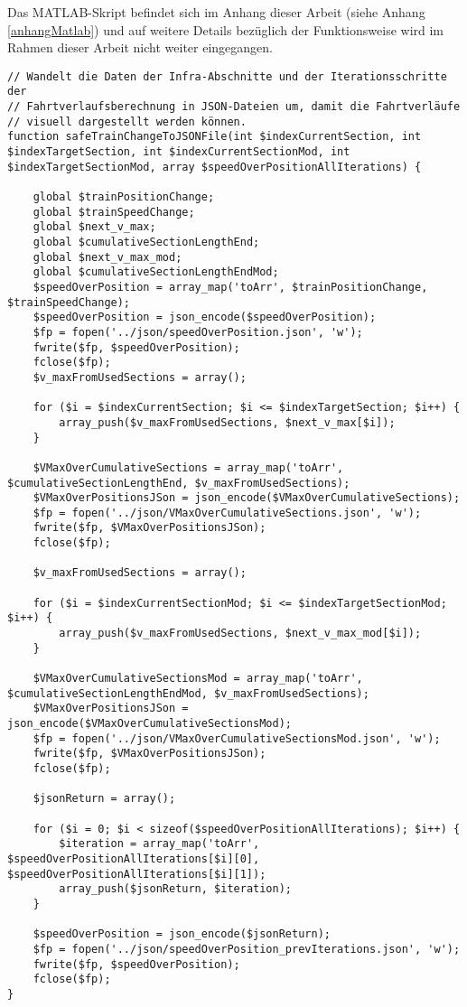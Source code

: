 Das MATLAB-Skript befindet sich im Anhang dieser Arbeit (siehe Anhang \ref{anhangMatlab}) und auf weitere Details bezüglich der Funktionsweise wird im Rahmen dieser Arbeit nicht weiter eingegangen.
\begin{lstlisting}[caption={\textit{safeTrainChangeToJSONFile$($$)$} (\textit{functions\_fahrtverlauf.php})},captionpos=b,label={lst:safeTrainChangeToJSONFile}]
// Wandelt die Daten der Infra-Abschnitte und der Iterationsschritte der
// Fahrtverlaufsberechnung in JSON-Dateien um, damit die Fahrtverläufe
// visuell dargestellt werden können.
function safeTrainChangeToJSONFile(int $indexCurrentSection, int $indexTargetSection, int $indexCurrentSectionMod, int $indexTargetSectionMod, array $speedOverPositionAllIterations) {

	global $trainPositionChange;
	global $trainSpeedChange;
	global $next_v_max;
	global $cumulativeSectionLengthEnd;
	global $next_v_max_mod;
	global $cumulativeSectionLengthEndMod;
	$speedOverPosition = array_map('toArr', $trainPositionChange, $trainSpeedChange);
	$speedOverPosition = json_encode($speedOverPosition);
	$fp = fopen('../json/speedOverPosition.json', 'w');
	fwrite($fp, $speedOverPosition);
	fclose($fp);
	$v_maxFromUsedSections = array();

	for ($i = $indexCurrentSection; $i <= $indexTargetSection; $i++) {
		array_push($v_maxFromUsedSections, $next_v_max[$i]);
	}

	$VMaxOverCumulativeSections = array_map('toArr', $cumulativeSectionLengthEnd, $v_maxFromUsedSections);
	$VMaxOverPositionsJSon = json_encode($VMaxOverCumulativeSections);
	$fp = fopen('../json/VMaxOverCumulativeSections.json', 'w');
	fwrite($fp, $VMaxOverPositionsJSon);
	fclose($fp);

	$v_maxFromUsedSections = array();

	for ($i = $indexCurrentSectionMod; $i <= $indexTargetSectionMod; $i++) {
		array_push($v_maxFromUsedSections, $next_v_max_mod[$i]);
	}

	$VMaxOverCumulativeSectionsMod = array_map('toArr', $cumulativeSectionLengthEndMod, $v_maxFromUsedSections);
	$VMaxOverPositionsJSon = json_encode($VMaxOverCumulativeSectionsMod);
	$fp = fopen('../json/VMaxOverCumulativeSectionsMod.json', 'w');
	fwrite($fp, $VMaxOverPositionsJSon);
	fclose($fp);

	$jsonReturn = array();

	for ($i = 0; $i < sizeof($speedOverPositionAllIterations); $i++) {
		$iteration = array_map('toArr', $speedOverPositionAllIterations[$i][0], $speedOverPositionAllIterations[$i][1]);
		array_push($jsonReturn, $iteration);
	}

	$speedOverPosition = json_encode($jsonReturn);
	$fp = fopen('../json/speedOverPosition_prevIterations.json', 'w');
	fwrite($fp, $speedOverPosition);
	fclose($fp);
}
\end{lstlisting}